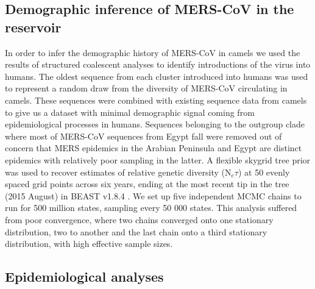 \documentclass[11pt,oneside,letterpaper]{article}
\def\gdc#1{\textcolor{blue}{[#1]}}
\def\lmc#1{\textcolor{green}{[#1]}}
\begin{document}
\subsection*{Demographic inference of MERS-CoV in the reservoir}
In order to infer the demographic history of MERS-CoV in camels we used the results of structured coalescent analyses to identify introductions of the virus into humans.
The oldest sequence from each cluster introduced into humans was used to represent a random draw from the diversity of MERS-CoV circulating in camels.
These sequences were combined with existing sequence data from camels to give us a dataset with minimal demographic signal coming from epidemiological processes in humans.
Sequences belonging to the outgroup clade where most of MERS-CoV sequences from Egypt fall were removed out of concern that MERS epidemics in the Arabian Peninsula and Egypt are distinct epidemics with relatively poor sampling in the latter.
A flexible skygrid tree prior \citep{gill_2013} was used to recover estimates of relative genetic diversity (N$_{e}\tau$) at 50 evenly spaced grid points across six years, ending at the most recent tip in the tree (2015 August) in BEAST v1.8.4 \citep{drummond_bayesian_2012}.
We set up five independent MCMC chains to run for 500 million states, sampling every 50 000 states.
This analysis suffered from poor convergence, where two chains converged onto one stationary distribution, two to another and the last chain onto a third stationary distribution, with high effective sample sizes.%

\subsection*{Epidemiological analyses}
\end{document}
